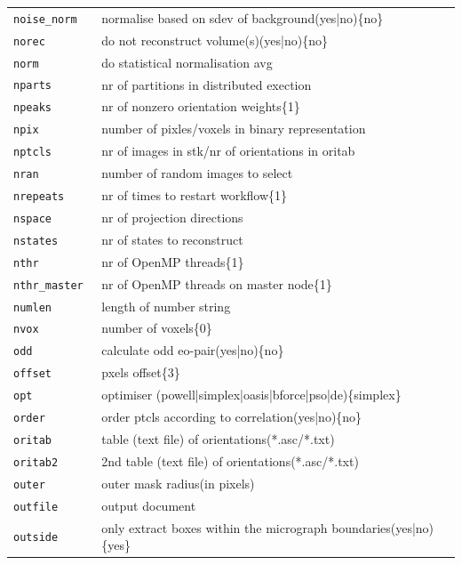 \documentclass[a4paper,11pt]{article}
\begin{document}
\begin{tabular}{ll}
\texttt{noise\_norm   }&{ normalise based on sdev of background(yes|no)\{no\}}\\
\texttt{norec        }&{ do not reconstruct volume(s)(yes|no)\{no\}}\\
\texttt{norm         }&{ do statistical normalisation avg}\\
\texttt{nparts       }&{ nr of partitions in distributed exection}\\
\texttt{npeaks       }&{ nr of nonzero orientation weights\{1\}}\\
\texttt{npix         }&{ number of pixles/voxels in binary representation}\\
\texttt{nptcls       }&{ nr of images in stk/nr of orientations in oritab}\\
\texttt{nran         }&{ number of random images to select}\\
\texttt{nrepeats     }&{ nr of times to restart workflow\{1\}}\\
\texttt{nspace       }&{ nr of projection directions}\\
\texttt{nstates      }&{ nr of states to reconstruct}\\
\texttt{nthr         }&{ nr of OpenMP threads\{1\}}\\
\texttt{nthr\_master  }&{ nr of OpenMP threads on master node\{1\}}\\
\texttt{numlen       }&{ length of number string}\\
\texttt{nvox         }&{ number of voxels\{0\}}\\
\texttt{odd          }&{ calculate odd eo-pair(yes|no)\{no\}}\\
\texttt{offset       }&{ pxels offset\{3\}}\\
\texttt{opt          }&{ optimiser (powell|simplex|oasis|bforce|pso|de)\{simplex\}}\\
\texttt{order        }&{ order ptcls according to correlation(yes|no)\{no\}}\\
\texttt{oritab       }&{ table (text file) of orientations(*.asc/*.txt)}\\
\texttt{oritab2      }&{ 2nd table (text file) of orientations(*.asc/*.txt)}\\
\texttt{outer        }&{ outer mask radius(in pixels)}\\
\texttt{outfile      }&{ output document}\\
\texttt{outside      }&{ only extract boxes within the micrograph boundaries(yes|no)\{yes\}}\\

\end{tabular}
\end{document}
